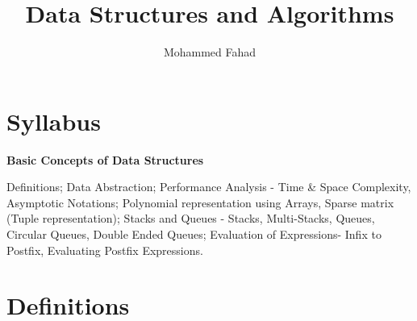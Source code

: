 \documentclass{article}
\title{Data Structures and Algorithms}
\author{Mohammed Fahad}
\begin{document}
\maketitle

\section{Syllabus}

\textbf{Basic Concepts of Data Structures}

Definitions; Data Abstraction; Performance Analysis - Time \& Space
Complexity, Asymptotic Notations; Polynomial representation using
Arrays, Sparse matrix (Tuple representation); Stacks and Queues - Stacks,
Multi-Stacks, Queues, Circular Queues, Double Ended Queues; Evaluation
of Expressions- Infix to Postfix, Evaluating Postfix Expressions.

\section{Definitions}
\end{document}
